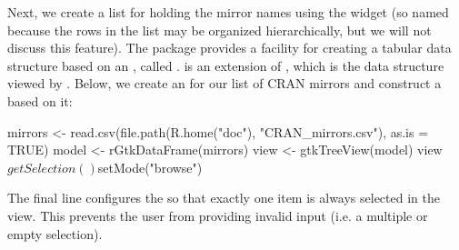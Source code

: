 \documentclass[article,shortnames]{jss}
\begin{document}
Next, we create a list for holding the mirror names using the
widget (so named because the rows in the list may be organized
hierarchically, but we will not discuss this feature). 
The  package provides a facility for creating a tabular
data structure based on an  ,
called .  is an extension of
, which is the data structure viewed by
. Below, we create an  for our
list of CRAN mirrors and construct a  based on it:
\begin{Code}
mirrors <- read.csv(file.path(R.home("doc"), "CRAN_mirrors.csv"),
                     as.is = TRUE)
model <- rGtkDataFrame(mirrors)
view <- gtkTreeView(model)
view$getSelection()$setMode("browse")
\end{Code}
The final line configures the  so that exactly one
item is always selected in the view. This prevents the user from
providing invalid input (i.e. a multiple or empty selection). 

%
%
\end{document}
